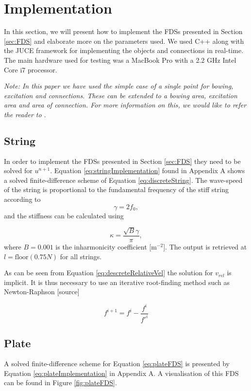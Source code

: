 \documentclass{article}
\begin{document}
\section{Implementation}
In this section, we will present how to implement the FDSs presented in Section \ref{sec:FDS} and elaborate more on the parameters used. We used C++ along with the JUCE framework for implementing the objects and connections in real-time. The main hardware used for testing was a MacBook Pro with a 2.2 GHz Intel Core i7 processor.

\textit{Note: In this paper we have used the simple case of a single point for bowing, excitation and connections. These can be extended to a bowing area, excitation area and area of connection. For more information on this, we would like to refer the reader to \cite{Bilbao2009:ModularPercussion}}.

\subsection{String}
In order to implement the FDSs presented in Section \ref{sec:FDS} they need to be solved for $u^{n+1}$. Equation \eqref{eq:stringImplementation} found in Appendix A shows a solved finite-difference scheme of Equation \eqref{eq:discreteString}.
The wave-speed of the string is proportional to the fundamental frequency of the stiff string according to
\begin{equation}
    \gamma = 2 f_0,
\end{equation}
and the stiffness can be calculated using

\begin{equation}
    \kappa = \frac{\sqrt{B}\gamma}{\pi},
\end{equation}
where $B = 0.001$ is the inharmonicity coefficient [m$^{-2}$].
The output is retrieved at $l = \text{floor}(0.75N)$ for all strings.

As can be seen from Equation \eqref{eq:descreteRelativeVel} the solution for $v_{rel}$ is implicit. It is thus necessary to use an iterative root-finding method such as Newton-Raphson [source]

\begin{equation}
    f^{i+1} = f^i - \frac{f^i}{f'^i}
\end{equation}

\subsection{Plate}
A solved finite-difference scheme for Equation \eqref{eq:plateFDS} is presented by Equation \eqref{eq:plateImplementation} in Appendix A. A visualisation of this FDS can be found in Figure \ref{fig:plateFDS}.
\end{document}
